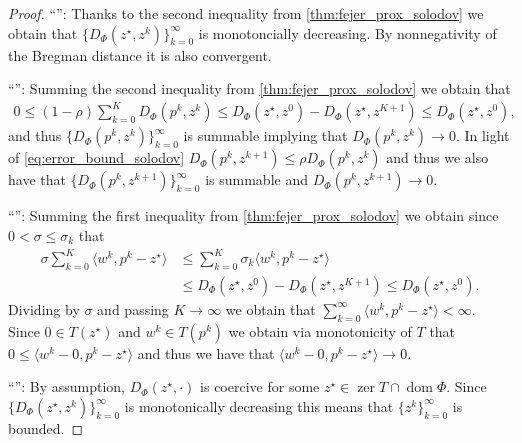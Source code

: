 \documentclass[11pt,onecolumn]{article}
\DeclareMathOperator{\dom}{dom}
\DeclareMathOperator{\zer}{zer}
\theoremstyle{remark}
\begin{document}
\begin{proof}
``'': Thanks to the second inequality from \cref{thm:fejer_prox_solodov} we obtain that $\{D_\Phi(z^\star, z^k)\}_{k=0}^\infty$ is monotoncially decreasing. By nonnegativity of the Bregman distance it is also convergent. 

``'': Summing the second inequality from \cref{thm:fejer_prox_solodov} we obtain that
\begin{align} \label{eq:sum_lemma}
0 \leq (1-\rho)\sum_{k=0}^K D_\Phi(p^{k},z^{k}) \leq D_\Phi(z^\star, z^0) - D_\Phi(z^\star, z^{K+1}) \leq D_\Phi(z^\star, z^0),
\end{align}
and thus $\{D_\Phi(p^{k},z^k)\}_{k=0}^\infty$ is summable implying that $D_\Phi(p^{k},z^k) \to 0$. In light of \cref{eq:error_bound_solodov} $D_\Phi(p^{k},z^{k+1}) \leq \rho D_\Phi(p^{k},z^k)$ and thus we also have that $\{D_\Phi(p^{k},z^{k+1})\}_{k=0}^\infty$ is summable and $D_\Phi(p^{k},z^{k+1}) \to 0$.

``'': Summing the first inequality from \cref{thm:fejer_prox_solodov} we obtain since $0< \sigma \leq \sigma_k$ that
\begin{align*}
\sigma \sum_{k=0}^K \langle w^{k}, p^{k}-z^\star \rangle &\leq \sum_{k=0}^K \sigma_k \langle w^{k}, p^{k}-z^\star \rangle \\
&\leq D_\Phi(z^\star,z^0)-D_\Phi(z^\star,z^{K+1}) \leq D_\Phi(z^\star,z^0).
\end{align*}
Dividing by $\sigma$ and passing $K \to \infty$ we obtain that $\sum_{k=0}^\infty \langle w^{k}, p^{k}-z^\star \rangle < \infty$. Since $0 \in T(z^\star)$ and $w^{k} \in T(p^{k})$ we obtain via monotonicity of $T$ that $0 \leq \langle w^{k}-0, p^{k}-z^\star \rangle$ and thus we have that $\langle w^{k} -0, p^{k}-z^\star \rangle \to 0$.

``'': By assumption, $D_\Phi(z^\star,\cdot)$ is coercive for some $z^\star \in \zer T \cap \dom \Phi$. Since $\{D_\Phi(z^\star,z^{k})\}_{k=0}^\infty$ is monotonically decreasing this means that $\{z^k\}_{k=0}^\infty$ is bounded.
\end{proof}
\end{document}
